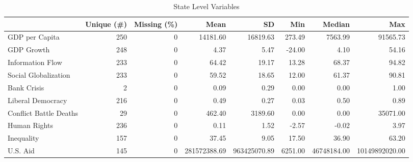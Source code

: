 \begin{table}

\caption{State Level Variables}
\centering
\begin{tabular}[t]{lrrrrrrr}
\toprule
  & Unique (\#) & Missing (\%) & Mean & SD & Min & Median & Max\\
\midrule
GDP per Capita & 250 & 0 & 14181.60 & 16819.63 & 273.49 & 7563.99 & 91565.73\\
GDP Growth & 248 & 0 & 4.37 & 5.47 & -24.00 & 4.10 & 54.16\\
Information Flow & 233 & 0 & 64.42 & 19.17 & 13.28 & 68.37 & 94.82\\
Social Globalization & 233 & 0 & 59.52 & 18.65 & 12.00 & 61.37 & 90.81\\
Bank Crisis & 2 & 0 & 0.09 & 0.29 & 0.00 & 0.00 & 1.00\\
Liberal Democracy & 216 & 0 & 0.49 & 0.27 & 0.03 & 0.50 & 0.89\\
Conflict Battle Deaths & 29 & 0 & 462.40 & 3189.60 & 0.00 & 0.00 & 35071.00\\
Human Rights & 236 & 0 & 0.11 & 1.52 & -2.57 & -0.02 & 3.97\\
Inequality & 157 & 0 & 37.45 & 9.05 & 17.50 & 36.90 & 63.20\\
U.S. Aid & 145 & 0 & 281572388.69 & 963425070.89 & 6251.00 & 46748184.00 & 10149892020.00\\
\bottomrule
\end{tabular}
\end{table}
